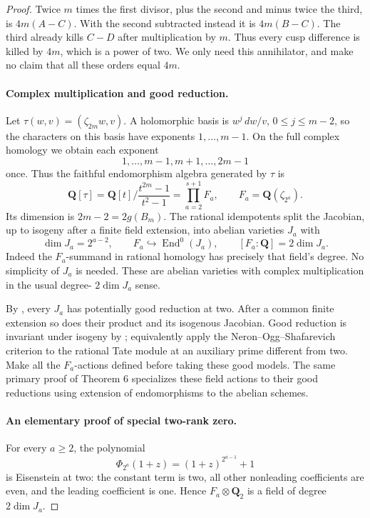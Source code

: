 \begin{proof}
Twice \(m\) times the first divisor, plus the
second and minus twice the third, is \(4m(A-C)\).
With the second subtracted instead it is \(4m(B-C)\).
The third already kills \(C-D\) after multiplication
by \(m\). Thus every cusp difference is killed
by \(4m\), which is a power of two. We only need
this annihilator, and make no claim that all these
orders equal \(4m\).

\paragraph{Complex multiplication and good reduction.}
Let
\(\tau(w,v)=(\zeta_{2m}w,v)\). A holomorphic
basis is
\(w^j\,dw/v\), \(0\le j\le m-2\), so the
characters on this basis have exponents
\(1,\ldots,m-1\). On the full complex homology
we obtain each exponent
\[
              1,\ldots,m-1,m+1,\ldots,2m-1
\]
once. Thus the faithful endomorphism algebra generated
by \(\tau\) is
\[
 \mathbf Q[\tau]
   =\mathbf Q[t]\bigg/\frac{t^{2m}-1}{t^2-1}
   =\prod_{a=2}^{s+1} F_a,
                  \qquad F_a=\mathbf Q(\zeta_{2^a}).  \tag{A.44.6}
\]
Its dimension is \(2m-2=2g(B_m)\). The rational
idempotents split the Jacobian, up to isogeny after
a finite field extension, into abelian varieties
\(J_a\) with
\[
       \dim J_a=2^{a-2},\qquad
       F_a\hookrightarrow\operatorname{End}^0(J_a),
       \qquad [F_a:\mathbf Q]=2\dim J_a.            \tag{A.44.7}
\]
Indeed the \(F_a\)-summand in rational homology
has precisely that field's degree. No simplicity
of \(J_a\) is needed. These are abelian varieties
with complex multiplication in the usual degree-
\(2\dim J_a\) sense.

By \cite[Theorem 6(a), printed p.503]{fghSerreTate1968},
every \(J_a\) has potentially good reduction at two.
After a common finite extension so does their product
and its isogenous Jacobian. Good reduction is invariant
under isogeny by \cite[Corollary 2 to Theorem 1, printed p.493]{fghSerreTate1968};
equivalently apply the Neron--Ogg--Shafarevich criterion
to the rational Tate module at an auxiliary prime different from two. Make all the \(F_a\)-actions
defined before taking these good models. The same primary
proof of Theorem 6 specializes these field actions to
their good reductions using extension of endomorphisms
to the abelian schemes.

\paragraph{An elementary proof of special two-rank zero.}
For every \(a\ge2\), the polynomial
\[
                  \Phi_{2^a}(1+z)=(1+z)^{2^{a-1}}+1
                                                               \tag{A.44.8}
\]
is Eisenstein at two: the constant term is two, all
other nonleading coefficients are even, and the leading
coefficient is one. Hence
\(F_a\otimes\mathbf Q_2\) is a field of degree
\(2\dim J_a\).


\end{proof}
